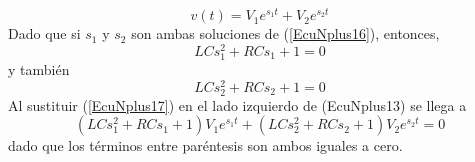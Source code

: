 \documentclass{article}
\begin{document}
\begin{equation}
v(t)=V_{1}e^{s_{1}t}+V_{2}e^{s_{2}t}
 \label{EcuNplus17} 
\end{equation}
Dado que si $s_{1}$ y $s_{2}$ son ambas soluciones de (\ref{EcuNplus16}), entonces,
\begin{equation}
 LCs_{1}^{2}+RCs_{1}+1=0
 \label{EcuNplus18}
\end{equation}
y tambi\'{e}n
\begin{equation}
 LCs_{2}^{2}+RCs_{2}+1=0
 \label{EcuNplus19}
\end{equation}
Al sustituir (\ref{EcuNplus17}) en el lado izquierdo de (EcuNplus13) se llega a
\begin{equation}
 \left(LCs_{1}^{2}+RCs_{1}+1\right)V_{1}e^{s_{1}t}+\left(LCs_{2}^{2}+RCs_{2}+1\right)V_{2}e^{s_{2}t}=0
\end{equation}
dado que los t\'{e}rminos entre par\'{e}ntesis son ambos iguales a cero.
\end{document}
